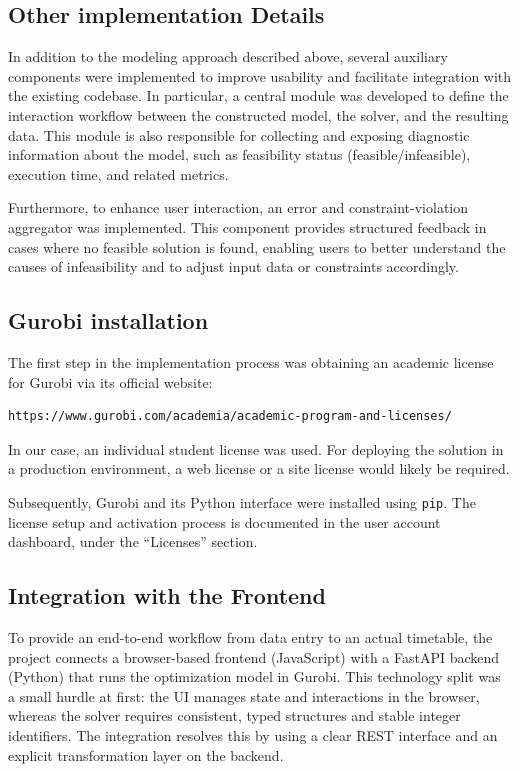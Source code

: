 \documentclass[11pt,a4paper]{article}
\begin{document}
\subsection{Other implementation Details}
In addition to the modeling approach described above, several auxiliary components were implemented to improve usability and facilitate integration with the existing codebase. In particular, a central module was developed to define the interaction workflow between the constructed model, the solver, and the resulting data. This module is also responsible for collecting and exposing diagnostic information about the model, such as feasibility status (feasible/infeasible), execution time, and related metrics.

Furthermore, to enhance user interaction, an error and constraint-violation aggregator was implemented. This component provides structured feedback in cases where no feasible solution is found, enabling users to better understand the causes of infeasibility and to adjust input data or constraints accordingly.


\subsection{Gurobi installation}
The first step in the implementation process was obtaining an academic license for Gurobi via its official website:
\begin{verbatim}
https://www.gurobi.com/academia/academic-program-and-licenses/
\end{verbatim}
In our case, an individual student license was used. For deploying the solution in a production environment, a web license or a site license would likely be required.

Subsequently, Gurobi and its Python interface were installed using \texttt{pip}. The license setup and activation process is documented in the user account dashboard, under the ``Licenses'' section.
\subsection{Integration with the Frontend}
To provide an end-to-end workflow from data entry to an actual timetable, the project connects a browser-based frontend (JavaScript) with a FastAPI backend (Python) that runs the optimization model in Gurobi. This technology split was a small hurdle at first: the UI manages state and interactions in the browser, whereas the solver requires consistent, typed structures and stable integer identifiers. The integration resolves this by using a clear REST interface and an explicit transformation layer on the backend.
\end{document}
